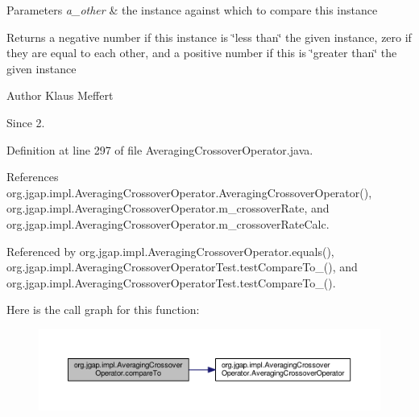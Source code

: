 \begin{DoxyParams}{Parameters}
{\em a\-\_\-other} & the instance against which to compare this instance \\
\hline
\end{DoxyParams}
\begin{DoxyReturn}{Returns}
a negative number if this instance is \char`\"{}less than\char`\"{} the given instance, zero if they are equal to each other, and a positive number if this is \char`\"{}greater than\char`\"{} the given instance
\end{DoxyReturn}
\begin{DoxyAuthor}{Author}
Klaus Meffert 
\end{DoxyAuthor}
\begin{DoxySince}{Since}
2. 
\end{DoxySince}


Definition at line 297 of file Averaging\-Crossover\-Operator.\-java.



References org.\-jgap.\-impl.\-Averaging\-Crossover\-Operator.\-Averaging\-Crossover\-Operator(), org.\-jgap.\-impl.\-Averaging\-Crossover\-Operator.\-m\-\_\-crossover\-Rate, and org.\-jgap.\-impl.\-Averaging\-Crossover\-Operator.\-m\-\_\-crossover\-Rate\-Calc.



Referenced by org.\-jgap.\-impl.\-Averaging\-Crossover\-Operator.\-equals(), org.\-jgap.\-impl.\-Averaging\-Crossover\-Operator\-Test.\-test\-Compare\-To\-\_(), and org.\-jgap.\-impl.\-Averaging\-Crossover\-Operator\-Test.\-test\-Compare\-To\-\_().



Here is the call graph for this function\-:
\nopagebreak
\begin{figure}[H]
\begin{center}
\leavevmode
\includegraphics[width=350pt]{classorg_1_1jgap_1_1impl_1_1_averaging_crossover_operator_a64d5267c8a2a2087c24839db5d2ff892_cgraph}
\end{center}
\end{figure}


